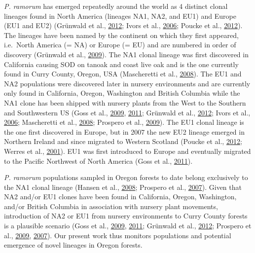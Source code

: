 \documentclass[double,11pt]{beavtex}
\begin{document}
  \emph{P. ramorum} has emerged repeatedly around the world as 4 distinct
  clonal lineages found in North America (lineages NA1, NA2, and EU1) and
  Europe (EU1 and EU2) (Grünwald et al.,
  \protect\hyperlink{ref-grunwald2012emergence}{2012}; Ivors et al.,
  \protect\hyperlink{ref-ivors2006microsatellite}{2006}; Poucke et al.,
  \protect\hyperlink{ref-vanpoucke2012discovery}{2012}). The lineages have
  been named by the continent on which they first appeared, i.e.~North
  America (= NA) or Europe (= EU) and are numbered in order of discovery
  (Grünwald et al.,
  \protect\hyperlink{ref-grunwald2009standardizing}{2009}). The NA1 clonal
  lineage was first discovered in California causing SOD on tanoak and
  coast live oak and is the one currently found in Curry County, Oregon,
  USA (Mascheretti et al.,
  \protect\hyperlink{ref-mascheretti2008reconstruction}{2008}). The EU1
  and NA2 populations were discovered later in nursery environments and
  are currently only found in California, Oregon, Washington and British
  Columbia while the NA1 clone has been shipped with nursery plants from
  the West to the Southern and Southwestern US (Goss et al.,
  \protect\hyperlink{ref-goss2009population}{2009},
  \protect\hyperlink{ref-goss2011phytophthora}{2011}; Grünwald et al.,
  \protect\hyperlink{ref-grunwald2012emergence}{2012}; Ivors et al.,
  \protect\hyperlink{ref-ivors2006microsatellite}{2006}; Mascheretti et
  al., \protect\hyperlink{ref-mascheretti2008reconstruction}{2008};
  Prospero et al., \protect\hyperlink{ref-prospero2009migration}{2009}).
  The EU1 clonal lineage is the one first discovered in Europe, but in
  2007 the new EU2 lineage emerged in Northern Ireland and since migrated
  to Western Scotland (Poucke et al.,
  \protect\hyperlink{ref-vanpoucke2012discovery}{2012}; Werres et al.,
  \protect\hyperlink{ref-werres2001phytophthora}{2001}). EU1 was first
  introduced to Europe and eventually migrated to the Pacific Northwest of
  North America (Goss et al.,
  \protect\hyperlink{ref-goss2011phytophthora}{2011}).
  
  \emph{P. ramorum} populations sampled in Oregon forests to date belong
  exclusively to the NA1 clonal lineage (Hansen et al.,
  \protect\hyperlink{ref-hansen2008epidemiology}{2008}; Prospero et al.,
  \protect\hyperlink{ref-prospero2007population}{2007}). Given that NA2
  and/or EU1 clones have been found in California, Oregon, Washington,
  and/or British Columbia in association with nursery plant movements,
  introduction of NA2 or EU1 from nursery environments to Curry County
  forests is a plausible scenario (Goss et al.,
  \protect\hyperlink{ref-goss2009population}{2009},
  \protect\hyperlink{ref-goss2011phytophthora}{2011}; Grünwald et al.,
  \protect\hyperlink{ref-grunwald2012emergence}{2012}; Prospero et al.,
  \protect\hyperlink{ref-prospero2009migration}{2009},
  \protect\hyperlink{ref-prospero2007population}{2007}). Our present work
  thus monitors populations and potential emergence of novel lineages in
  Oregon forests.
  
\end{document}
